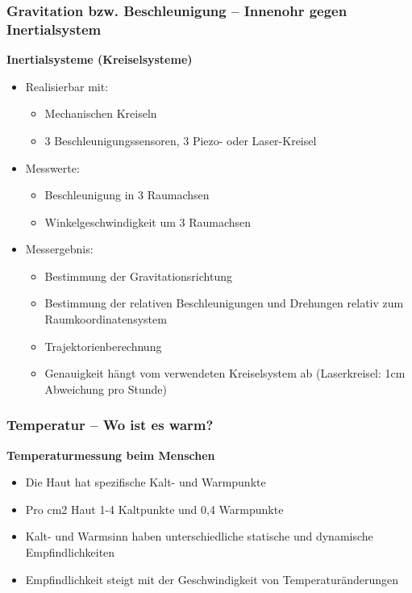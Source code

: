 \subsubsection{Gravitation bzw. Beschleunigung – Innenohr gegen Inertialsystem}
\textbf{Inertialsysteme (Kreiselsysteme)}
\begin{itemize}
\setlength\itemsep{0em}
\item Realisierbar mit:
\begin{itemize}
\setlength\itemsep{0em}
\item Mechanischen Kreiseln
\item 3 Beschleunigungssensoren, 3 Piezo- oder Laser-Kreisel
\end{itemize}
\item Messwerte:
\begin{itemize}
\setlength\itemsep{0em}
\item Beschleunigung in 3 Raumachsen
\item Winkelgeschwindigkeit um 3 Raumachsen
\end{itemize}
\item Messergebnis:
\begin{itemize}
\setlength\itemsep{0em}
\item Bestimmung der Gravitationsrichtung
\item Bestimmung der relativen Beschleunigungen und Drehungen relativ zum Raumkoordinatensystem
\item  Trajektorienberechnung
\item Genauigkeit hängt vom verwendeten Kreiselsystem ab (Laserkreisel: 1cm Abweichung pro Stunde)
\end{itemize}
\end{itemize}
\subsubsection{Temperatur – Wo ist es warm?}
\textbf{Temperaturmessung beim Menschen}
\begin{itemize}
\setlength\itemsep{0em}
\item Die Haut hat spezifische Kalt- und Warmpunkte
\item Pro cm2 Haut 1-4 Kaltpunkte und 0,4 Warmpunkte
\item Kalt- und Warmsinn haben unterschiedliche statische und dynamische Empfindlichkeiten
\item Empfindlichkeit steigt mit der Geschwindigkeit von Temperaturänderungen
\end{itemize}

